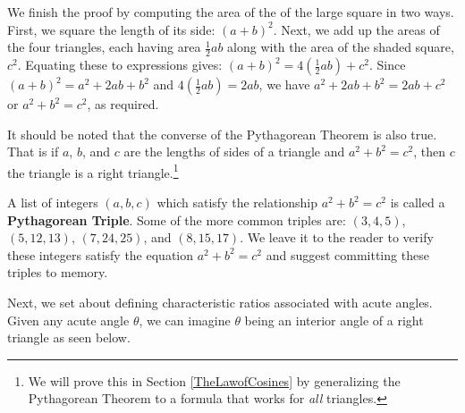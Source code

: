 \documentclass{ximera}
\begin{document}
We finish the proof by computing the area of the of the  large square in two ways.  First, we square the length of its side: $(a+b)^2$.  Next, we add up the areas of the four triangles, each having area $\frac{1}{2} ab$ along with the area of the shaded square, $c^2$.  Equating these to expressions gives: $(a+b)^2 = 4 \left( \frac{1}{2} ab\right)+c^2$.  Since $(a+b)^2 = a^2+2ab+b^2$ and $4 \left( \frac{1}{2} ab\right)  = 2ab$, we have $a^2+2ab+b^2 = 2ab + c^2$ or $a^2+b^2 = c^2$, as required.

It should be noted that the converse of the Pythagorean Theorem is also true.  That is if $a$, $b$, and $c$ are the lengths of sides of a triangle and $a^2+b^2 = c^2$, then $c$ the triangle is a right triangle.\footnote{We will prove this in Section \ref{TheLawofCosines} by generalizing the Pythagorean Theorem to a formula that works for \textit{all} triangles.}



A list of integers $(a,b,c)$  which satisfy the relationship $a^2+b^2 = c^2$ is called a  \textbf{Pythagorean Triple}.  Some of the more common triples are: $(3,4,5)$,  $(5,12,13)$, $(7,24,25)$, and $(8,15,17)$.   We leave it to the reader to verify these integers satisfy the equation $a^2+b^2 = c^2$ and suggest committing these triples to memory.



Next, we set about defining characteristic ratios associated with acute angles.  Given any acute angle $\theta$, we can imagine $\theta$ being an interior angle of a right triangle as seen below.   

\label{righttranglediagram}

\begin{image}
\end{image}
\end{document}
